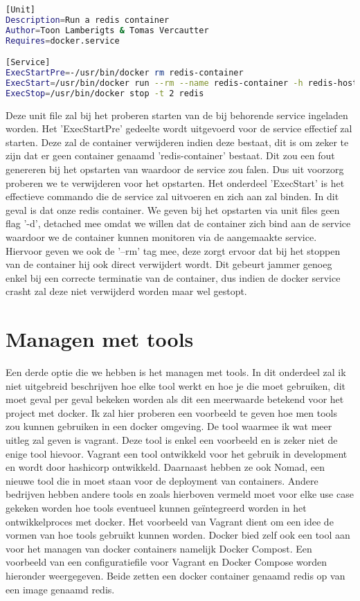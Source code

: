\begin{lstlisting}[language=bash, style=configstyle]
[Unit]
Description=Run a redis container
Author=Toon Lamberigts & Tomas Vercautter
Requires=docker.service

[Service]
ExecStartPre=-/usr/bin/docker rm redis-container
ExecStart=/usr/bin/docker run --rm --name redis-container -h redis-host redis
ExecStop=/usr/bin/docker stop -t 2 redis
\end{lstlisting}

Deze unit file zal bij het proberen starten van de bij behorende service ingeladen worden. Het 'ExecStartPre' gedeelte wordt uitgevoerd voor de service effectief zal starten. Deze zal de container verwijderen indien deze bestaat, dit is om zeker te zijn dat er geen container genaamd 'redis-container' bestaat. Dit zou een fout genereren bij het opstarten van waardoor de service zou falen. Dus uit voorzorg proberen we te verwijderen voor het opstarten. Het onderdeel 'ExecStart' is het effectieve commando die de service zal uitvoeren en zich aan zal binden. In dit geval is dat onze redis container. We geven bij het opstarten via unit files geen flag '-d', detached mee omdat we willen dat de container zich bind aan de service waardoor we de container kunnen monitoren via de aangemaakte service. Hiervoor geven we ook de '--rm' tag mee, deze zorgt ervoor dat bij het stoppen van de container hij ook direct verwijdert wordt. Dit gebeurt jammer genoeg enkel bij een correcte terminatie van de container, dus indien de docker service crasht zal deze niet verwijderd worden maar wel gestopt.

\section{Managen met tools}

Een derde optie die we hebben is het managen met tools. In dit onderdeel zal ik niet uitgebreid beschrijven hoe elke tool werkt en hoe je die moet gebruiken, dit moet geval per geval bekeken worden als dit een meerwaarde betekend voor het project met docker. Ik zal hier proberen een voorbeeld te geven hoe men tools zou kunnen gebruiken in een docker omgeving. De tool waarmee ik wat meer uitleg zal geven is vagrant. Deze tool is enkel een voorbeeld en is zeker niet de enige tool hievoor. Vagrant een tool ontwikkeld voor het gebruik in development en wordt door hashicorp ontwikkeld. Daarnaast hebben ze ook Nomad, een nieuwe tool die in moet staan voor de deployment van containers. Andere bedrijven hebben andere tools en zoals hierboven vermeld moet voor elke use case gekeken worden hoe tools eventueel kunnen geïntegreerd worden in het ontwikkelproces met docker. Het voorbeeld van Vagrant dient om een idee de vormen van hoe tools gebruikt kunnen worden. Docker bied zelf ook een tool aan voor het managen van docker containers namelijk Docker Compost. Een voorbeeld van een configuratiefile voor Vagrant en Docker Compose worden hieronder weergegeven. Beide zetten een docker container genaamd redis op van een image genaamd redis.

